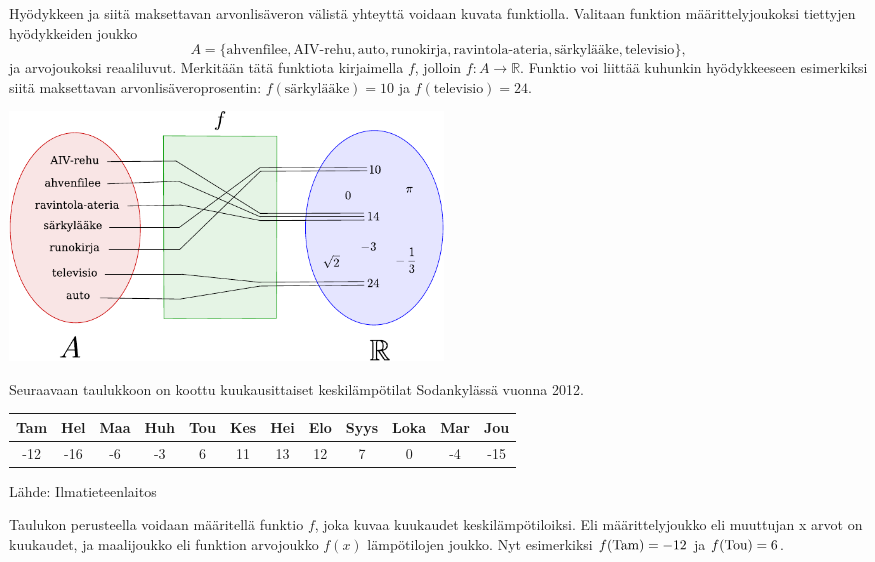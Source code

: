\begin{esimerkki}
	Hyödykkeen ja siitä maksettavan arvonlisäveron välistä yhteyttä voidaan kuvata funktiolla.
	Valitaan funktion määrittelyjoukoksi tiettyjen hyödykkeiden joukko
		\[ A = \{\text{ahvenfilee}, \text{AIV-rehu}, \text{auto}, \text{runokirja},
		\text{ravintola-ateria}, \text{särkylääke}, \text{televisio}\}, \]
	ja arvojoukoksi reaaliluvut. Merkitään tätä funktiota kirjaimella $f$, jolloin
	$f\colon A \to \mathbb{R}$.
	Funktio voi liittää kuhunkin hyödykkeeseen esimerkiksi siitä maksettavan arvonlisäveroprosentin:
	$f(\text{särkylääke}) = 10$ ja $f(\text{televisio}) = 24$.

	\begin{center}
		\includegraphics[width=11.5cm]{pictures/funktiokone.pdf}
	\end{center}
\end{esimerkki}


\begin{esimerkki}
Seuraavaan taulukkoon on koottu kuukausittaiset keskilämpötilat Sodankylässä vuonna 2012.

	\begin{tabular}{|c|c|c|c|c|c|c|c|c|c|c|c|}
	\hline
	Tam & Hel & Maa & Huh & Tou & Kes & Hei & Elo & Syys & Loka & Mar & Jou\\
	\hline
	-12 & -16 & -6 & -3 & 6 & 11 & 13 & 12 & 7 & 0 & -4 & -15\\
	\hline
	\end{tabular}
Lähde: Ilmatieteenlaitos

Taulukon perusteella voidaan määritellä funktio $f$, joka kuvaa kuukaudet keskilämpötiloiksi. Eli määrittelyjoukko eli muuttujan x arvot on kuukaudet, ja maalijoukko eli funktion arvojoukko \(f(x)\) lämpötilojen joukko. Nyt esimerkiksi \(f($Tam$)=-12\) ja \(f($Tou$) = 6\). 
\end{esimerkki}

